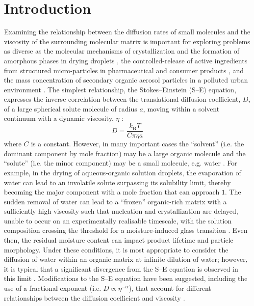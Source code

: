 \section{Introduction}
Examining the relationship between the diffusion rates of small molecules and the viscosity of the surrounding molecular matrix is important for exploring problems as diverse as the molecular mechanisms of crystallization and the formation of amorphous phases in drying droplets \cite{Nascimento2010,Mikhailov2009a,Koop2011}, the controlled-release of active ingredients from structured micro-particles in pharmaceutical and consumer products \cite{hidy1984aerosols,Hancock1997,Lorenz2011,Haddrell2014}, and the mass concentration of secondary organic aerosol particles in a polluted urban environment \cite{Shiraiwa2012a,mai2015under,Maclean2017}. The simplest relationship, the Stokes–Einstein (S–E) equation, expresses the inverse correlation between the translational diffusion coefficient, $D$, of a large spherical solute molecule of radius $a$, moving within a solvent continuum with a dynamic viscosity, $\eta$ \cite{powerTransitionLiquidSolidlike2013,chenStokesEinsteinRelationSupercooled2006}:
\begin{equation}\label{eqn:diffusion}
D=\frac{k_{\mathrm{B}} T}{C \pi \eta a}
\end{equation}
where $C$ is a constant. However, in many important cases the ``solvent” (i.e. the dominant component by mole fraction) may be a large organic molecule and the ``solute” (i.e. the minor component) may be a small molecule, e.g. water \cite{powerTransitionLiquidSolidlike2013,Price2014,Molinero2005}. For example, in the drying of aqueous-organic solution droplets, the evaporation of water can lead to an involatile solute surpassing its solubility limit, thereby becoming the major component with a mole fraction that can approach $1$. The sudden removal of water can lead to a ``frozen'' organic-rich matrix with a sufficiently high viscosity such that nucleation and crystallization are delayed, unable to occur on an experimentally realisable timescale, with the solution composition crossing the threshold for a moisture-induced glass transition \cite{Bones2012}. Even then, the residual moisture content can impact product lifetime and particle morphology. Under these conditions, it is most appropriate to consider the diffusion of water within an organic matrix at infinite dilution of water; however, it is typical that a significant divergence from the S–E equation is observed in this limit \cite{powerTransitionLiquidSolidlike2013,Price2015,Chenyakin2017}. Modifications to the S–E equation have been suggested, including the use of a fractional exponent (i.e. $D \propto \eta^{-\alpha}$), that account for different relationships between the diffusion coefficient and viscosity \cite{Harris2009,price2016sucrose, Fernandez-Alonso2007}.

